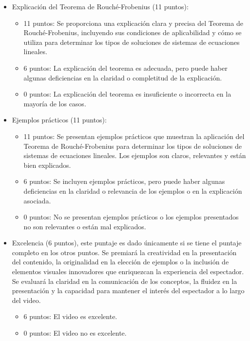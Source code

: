 \documentclass[a4,11pt]{aleph-notas}
\begin{document}
\begin{itemize}
\item
    Explicación del Teorema de Rouché-Frobenius (11 puntos):
    \begin{itemize}
        \item 11 puntos: Se proporciona una explicación clara y precisa del Teorema de Rouché-Frobenius, incluyendo sus condiciones de aplicabilidad y cómo se utiliza para determinar los tipos de soluciones de sistemas de ecuaciones lineales.
        \item 6 puntos: La explicación del teorema es adecuada, pero puede haber algunas deficiencias en la claridad o completitud de la explicación.
        \item 0 puntos: La explicación del teorema es insuficiente o incorrecta en la mayoría de los casos.
    \end{itemize}

\item
    Ejemplos prácticos (11 puntos):
    \begin{itemize}
        \item 11 puntos: Se presentan ejemplos prácticos que muestran la aplicación del Teorema de Rouché-Frobenius para determinar los tipos de soluciones de sistemas de ecuaciones lineales. Los ejemplos son claros, relevantes y están bien explicados.
        \item 6 puntos: Se incluyen ejemplos prácticos, pero puede haber algunas deficiencias en la claridad o relevancia de los ejemplos o en la explicación asociada.
        \item 0 puntos: No se presentan ejemplos prácticos o los ejemplos presentados no son relevantes o están mal explicados.
    \end{itemize}


\item
    Excelencia (6 puntos), este puntaje es dado únicamente si se tiene el puntaje completo en los otros puntos. Se premiará la creatividad en la presentación del contenido, la originalidad en la elección de ejemplos o la inclusión de elementos visuales innovadores que enriquezcan la experiencia del espectador. Se evaluará la claridad en la comunicación de los conceptos, la fluidez en la presentación y la capacidad para mantener el interés del espectador a lo largo del video.
    \begin{itemize}
        \item 6 puntos: El video es excelente.
        \item 0 puntos: El video no es excelente.
    \end{itemize}

\end{itemize}
\end{document}

